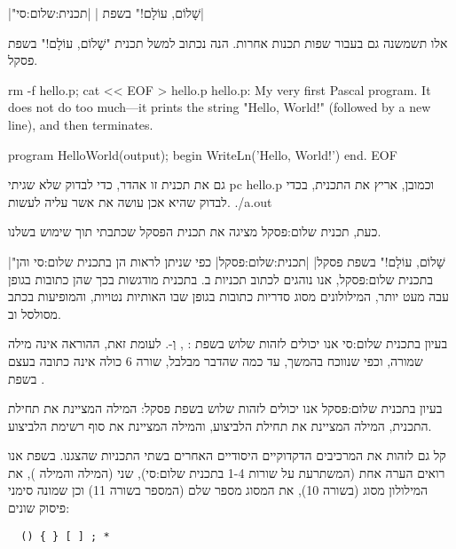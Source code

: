 \setLTR

\setRTL
{}|"שָׁלוֹם, עוֹלָם!" בשפת |
|תכנית:שלום:סי|

 אלו תשמשנה גם בעבור שפות תכנות אחרות. הנה נכתוב למשל תכנית "שָׁלוֹם,
עוֹלָם!" בשפת פסקל.

rm -f hello.p; cat << EOF > hello.p
{hello.p: My very first Pascal program. It does not do
  too much---it prints the string "Hello, World!" (followed
by a new line), and then terminates.}

program HelloWorld(output);
begin
  WriteLn('Hello, World!')
end.
EOF
\END
{}

גם את תכנית זו אהדר, כדי לבדוק שלא שגיתי
pc hello.p
\END
וכמובן, אריץ את התכנית, בכדי לבדוק שהיא אכן עושה את אשר עליה לעשות.
./a.out
\END

כעת,  תכנית שלום:פסקל מציגה את תכנית הפסקל שכתבתי תוך שימוש ב שלנו.

\setLTR

\setRTL
{}|"שָׁלוֹם, עוֹלָם!" בשפת פסקל|
|תכנית:שלום:פסקל|
כפי שניתן לראות הן ב תכנית שלום:סי והן ב תכנית שלום:פסקל, אנו נוהגים
לכתוב תכניות ב.  בתכנית
מודגשות בכך שהן כתובות בגופן עבה מעט יותר, המילולונים מסוג סדריות כתובות בגופן
שבו האותיות נטויות, וה מופיעות בכתב מסולסל וב.

בעיון ב תכנית שלום:סי אנו יכולים לזהות שלוש 
בשפת : ,  וְ-. לעומת זאת, ההוראה 
אינה מילה שמורה, וכפי שנווכח בהמשך, עד כמה שהדבר מבלבל, שורה 6 כולה אינה כתובה
בעצם בשפת .

בעיון ב תכנית שלום:פסקל אנו יכולים לזהות שלוש  בשפת פסקל: המילה  המציינת את תחילת התכנית, המילה
 המציינת את תחילת ה לביצוע, והמילה  המציינת את סוף
רשימת ה לביצוע.

קל גם לזהות את המרכיבים הדקדוקיים היסודיים האחרים בשתי התכניות שהצגנו. בשפת
 אנו רואים הערה אחת (המשתרעת על שורות 1-4 ב תכנית שלום:סי), שני 
(המילה  והמילה ), את המילולון מסוג  (בשורה 10), את
ה מסוג מספר שלם (המספר  בשורה 11) וכן שמונה סימני פיסוק שונים:

\let\ttfamily=\listingsfont
\begin{verbatim}
  () { } [ ] ; *
\end{verbatim}


